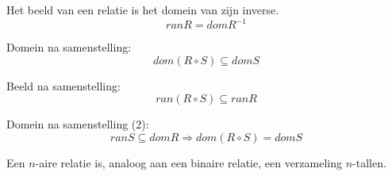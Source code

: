 \documentclass[main.tex]{subfiles}
\begin{document}
\begin{st}
  Het beeld van een relatie is het domein van zijn inverse.
  \[ ran R = dom R^{-1} \]
\end{st}

\begin{st}
  Domein na samenstelling:
  \[ dom (R \circ S) \subseteq dom S \]
\end{st}
 
\begin{st}
  Beeld na samenstelling:
  \[ ran (R \circ S) \subseteq ran R \]
\end{st}

\begin{st}
  Domein na samenstelling (2):
  \[ ran S \subseteq dom R \Rightarrow dom(R \circ S) = dom S \]
\end{st}

\begin{de}
  Een $n$-aire relatie is, analoog aan een binaire relatie, een verzameling $n$-tallen.
\end{de}
\end{document}
